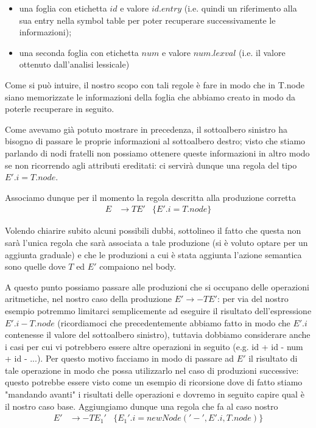 \documentclass[class=book, crop=false, oneside, 12pt]{standalone}
\begin{document}
\begin{itemize}
    \item una foglia con etichetta \(id\) e valore \(id.entry\) (i.e. quindi un riferimento alla sua entry nella symbol table per poter recuperare successivamente le informazioni);
    \item una seconda foglia con etichetta \(num\) e valore \(num.lexval\) (i.e. il valore ottenuto dall'analisi lessicale)
\end{itemize}

Come si può intuire, il nostro scopo con tali regole è fare in modo che in T.node siano memorizzate le informazioni della foglia che abbiamo creato in modo da poterle recuperare in seguito.

Come avevamo già potuto mostrare in precedenza, il sottoalbero sinistro ha bisogno di passare le proprie informazioni al sottoalbero destro; visto che stiamo parlando di nodi fratelli non possiamo ottenere queste informazioni in altro modo se non ricorrendo agli attributi ereditati: ci servirà dunque una regola del tipo \(E'.i = T.node\).

Associamo dunque per il momento la regola descritta alla produzione corretta 
\begin{align*}
    E &\to TE' &\{E'.i = T.node\}
\end{align*}

Volendo chiarire subito alcuni possibili dubbi, sottolineo il fatto che questa non sarà l'unica regola che sarà associata a tale produzione (si è voluto optare per un aggiunta graduale) e che le produzioni a cui è stata aggiunta l'azione semantica sono quelle dove \(T\) ed \(E'\) compaiono nel body.

A questo punto possiamo passare alle produzioni che si occupano delle operazioni aritmetiche, nel nostro caso della produzione \(E' \to -TE'\): per via del nostro esempio potremmo limitarci semplicemente ad eseguire il risultato dell'espressione \(E'.i - T.node\) (ricordiamoci che precedentemente abbiamo fatto in modo che \(E'.i\) contenesse il valore del sottoalbero sinistro), tuttavia dobbiamo considerare anche i casi per cui vi potrebbero essere altre operazioni in seguito (e.g. id + id - num + id - ...). Per questo motivo facciamo in modo di passare ad \(E'\) il risultato di tale operazione in modo che possa utilizzarlo nel caso di produzioni successive: questo potrebbe essere visto come un esempio di ricorsione dove di fatto stiamo "mandando avanti" i risultati delle operazioni e dovremo in seguito capire qual è il nostro caso base. Aggiungiamo dunque una regola che fa al caso nostro 
\begin{align*}
    E' &\to -TE_{1}' &\{E_{1}'.i = newNode('-', E'.i, T.node)\}
\end{align*}
\end{document}
